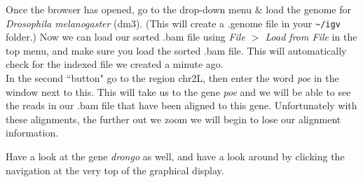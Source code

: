 \begin{steps}
Once the browser has opened, go to the drop-down menu \& load the genome for \textit{Drosophila melanogaster} (dm3).
(This will create a .genome file in your \texttt{\~{}/igv} folder.)
Now we can load our sorted .bam file using  \textit{File $>$ Load from File} in the top menu, and make sure you load the sorted .bam file.
This will automatically check for the indexed file we created a minute ago. \\

In the second ``button" go to the region chr2L, then enter the word \textit{poe} in the window next to this.
This will take us to the gene \textit{poe} and we will be able to see the reads in our .bam file that have been aligned to this gene.
Unfortunately with these alignments, the further out we zoom we will begin to lose our alignment information.

Have a look at the gene \textit{drongo} as well, and have a look around by clicking the navigation at the very top of the graphical display.
\end{steps}



